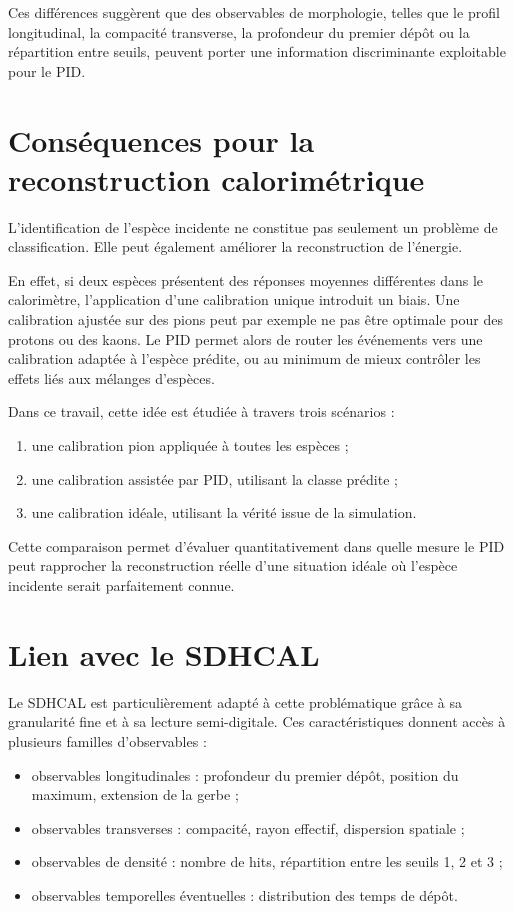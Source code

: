 Ces différences suggèrent que des observables de morphologie, telles que le profil longitudinal, la compacité transverse, la profondeur du premier dépôt ou la répartition entre seuils, peuvent porter une information discriminante exploitable pour le PID.

\section{Conséquences pour la reconstruction calorimétrique}
\label{sec:consequences-reco}

L'identification de l'espèce incidente ne constitue pas seulement un problème de classification. Elle peut également améliorer la reconstruction de l'énergie.

En effet, si deux espèces présentent des réponses moyennes différentes dans le calorimètre, l'application d'une calibration unique introduit un biais. Une calibration ajustée sur des pions peut par exemple ne pas être optimale pour des protons ou des kaons. Le PID permet alors de router les événements vers une calibration adaptée à l'espèce prédite, ou au minimum de mieux contrôler les effets liés aux mélanges d'espèces.

Dans ce travail, cette idée est étudiée à travers trois scénarios :

\begin{enumerate}[label=(\roman*)]
    \item une calibration pion appliquée à toutes les espèces ;
    \item une calibration assistée par PID, utilisant la classe prédite ;
    \item une calibration idéale, utilisant la vérité issue de la simulation.
\end{enumerate}

Cette comparaison permet d'évaluer quantitativement dans quelle mesure le PID peut rapprocher la reconstruction réelle d'une situation idéale où l'espèce incidente serait parfaitement connue.

\section{Lien avec le SDHCAL}
\label{sec:lien-sdhcal-pid}

Le SDHCAL est particulièrement adapté à cette problématique grâce à sa granularité fine et à sa lecture semi-digitale. Ces caractéristiques donnent accès à plusieurs familles d'observables :

\begin{itemize}
    \item observables longitudinales : profondeur du premier dépôt, position du maximum, extension de la gerbe ;
    \item observables transverses : compacité, rayon effectif, dispersion spatiale ;
    \item observables de densité : nombre de hits, répartition entre les seuils 1, 2 et 3 ;
    \item observables temporelles éventuelles : distribution des temps de dépôt.
\end{itemize}

